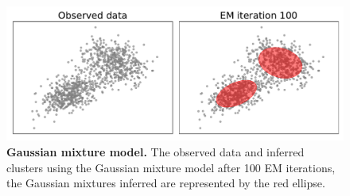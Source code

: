 \begin{figure}[h!]
    \centering
    \includegraphics[width=\textwidth]{figures/gmm_visualize.pdf}
    \caption{\textbf{Gaussian mixture model.} The observed data and inferred clusters using the Gaussian mixture model after 100 EM iterations, the Gaussian mixtures inferred are represented by the red ellipse.}
    \label{fig:gb-gmm-visualize}
\end{figure}

